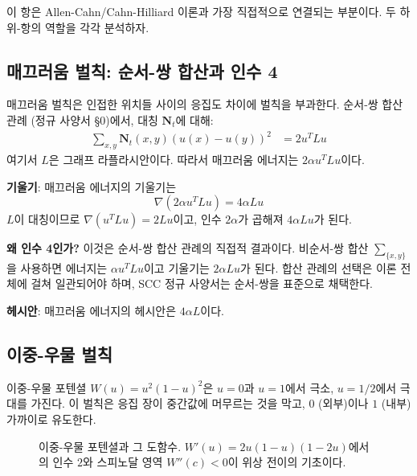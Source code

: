 이 항은 Allen-Cahn/Cahn-Hilliard 이론과 가장 직접적으로 연결되는 부분이다. 두 하위-항의 역할을 각각 분석하자.

\subsection{매끄러움 벌칙: 순서-쌍 합산과 인수 4}

매끄러움 벌칙은 인접한 위치들 사이의 응집도 차이에 벌칙을 부과한다. 순서-쌍 합산 관례 (정규 사양서 §0)에서, 대칭 $\mathbf{N}_t$에 대해:
\begin{align}
    \sum_{x,y} \mathbf{N}_t(x,y)(u(x) - u(y))^2 &= 2 u^T L u
    \label{eq:smoothness-laplacian}
\end{align}
여기서 $L$은 그래프 라플라시안이다. 따라서 매끄러움 에너지는 $2\alpha u^T L u$이다.

\textbf{기울기}: 매끄러움 에너지의 기울기는
\begin{equation}
    \nabla(2\alpha u^T L u) = 4\alpha L u
    \label{eq:grad-smoothness}
\end{equation}
$L$이 대칭이므로 $\nabla(u^T L u) = 2Lu$이고, 인수 $2\alpha$가 곱해져 $4\alpha Lu$가 된다.

\textbf{왜 인수 4인가?} 이것은 순서-쌍 합산 관례의 직접적 결과이다. 비순서-쌍 합산 $\sum_{\{x,y\}}$을 사용하면 에너지는 $\alpha u^T L u$이고 기울기는 $2\alpha Lu$가 된다. 합산 관례의 선택은 이론 전체에 걸쳐 일관되어야 하며, SCC 정규 사양서는 순서-쌍을 표준으로 채택한다.

\textbf{헤시안}: 매끄러움 에너지의 헤시안은 $4\alpha L$이다.

\subsection{이중-우물 벌칙}

이중-우물 포텐셜 $W(u) = u^2(1-u)^2$은 $u = 0$과 $u = 1$에서 극소, $u = 1/2$에서 극대를 가진다. 이 벌칙은 응집 장이 중간값에 머무르는 것을 막고, $0$ (외부)이나 $1$ (내부) 가까이로 유도한다.

\begin{figure}[t]
\centering
\caption{이중-우물 포텐셜과 그 도함수. $W'(u) = 2u(1-u)(1-2u)$에서의 인수 $2$와 스피노달 영역 $W''(c) < 0$이 위상 전이의 기초이다.}
\label{fig:double-well}
\end{figure}

